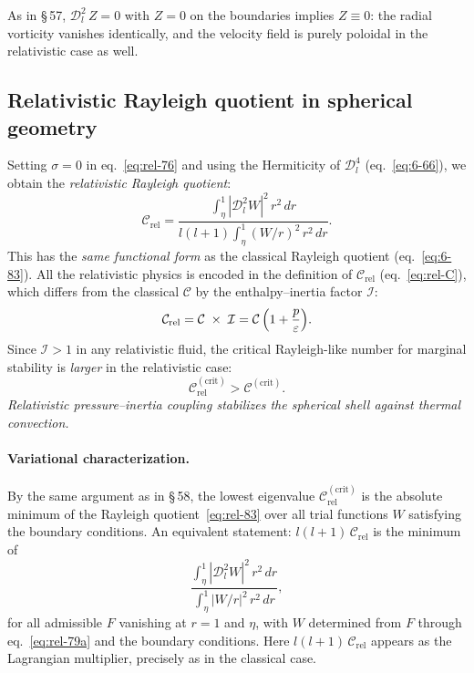 As in \S\,57, $\mathscr{D}_{l}^{2}\,Z = 0$ with $Z = 0$ on the
boundaries implies $Z \equiv 0$: the radial vorticity vanishes
identically, and the velocity field is purely poloidal in the
relativistic case as well.

\subsection{Relativistic Rayleigh quotient in spherical geometry}
\label{sec:rel-58-Rayleigh}

Setting $\sigma = 0$ in eq.~\eqref{eq:rel-76} and using the
Hermiticity of $\mathscr{D}_{l}^{4}$ (eq.~\eqref{eq:6-66}), we obtain
the \emph{relativistic Rayleigh quotient}:
\begin{equation}
  \boxed{
  \mathcal{C}_{\mathrm{rel}}
  = \frac{\displaystyle
      \int_{\eta}^{1}|\mathscr{D}_{l}^{2}W|^{2}\,r^{2}\,dr}
    {\displaystyle
      l(l+1)\int_{\eta}^{1}\!(W/r)^{2}\,r^{2}\,dr}.
  }
  \label{eq:rel-83}
\end{equation}
This has the \emph{same functional form} as the classical Rayleigh
quotient (eq.~\eqref{eq:6-83}).  All the relativistic physics is
encoded in the definition of $\mathcal{C}_{\mathrm{rel}}$
(eq.~\eqref{eq:rel-C}), which differs from the classical
$\mathcal{C}$ by the enthalpy--inertia factor $\mathcal{I}$:
\begin{equation}
  \mathcal{C}_{\mathrm{rel}}
  = \mathcal{C}\;\times\;\mathcal{I}
  = \mathcal{C}\,\Bigl(1 + \frac{p}{\varepsilon}\Bigr).
  \label{eq:rel-C-vs-classical}
\end{equation}
Since $\mathcal{I} > 1$ in any relativistic fluid, the critical
Rayleigh-like number for marginal stability is \emph{larger} in the
relativistic case:
\begin{equation}
  \mathcal{C}_{\mathrm{rel}}^{(\mathrm{crit})}
  > \mathcal{C}^{(\mathrm{crit})}.
  \label{eq:rel-stab-increase}
\end{equation}
\emph{Relativistic pressure--inertia coupling stabilizes the spherical
shell against thermal convection.}

\paragraph{Variational characterization.}
By the same argument as in \S\,58, the lowest eigenvalue
$\mathcal{C}_{\mathrm{rel}}^{(\mathrm{crit})}$ is the absolute
minimum of the Rayleigh quotient~\eqref{eq:rel-83} over all trial
functions $W$ satisfying the boundary conditions.  An equivalent
statement: $l(l+1)\,\mathcal{C}_{\mathrm{rel}}$ is the minimum of
\begin{equation}
  \frac{\displaystyle
    \int_{\eta}^{1}|\mathscr{D}_{l}^{2}W|^{2}\,r^{2}\,dr}
  {\displaystyle
    \int_{\eta}^{1}|W/r|^{2}\,r^{2}\,dr},
  \label{eq:rel-84}
\end{equation}
for all admissible $F$ vanishing at $r = 1$ and $\eta$, with $W$
determined from $F$ through eq.~\eqref{eq:rel-79a} and the boundary
conditions.  Here $l(l+1)\,\mathcal{C}_{\mathrm{rel}}$ appears as the
Lagrangian multiplier, precisely as in the classical case.

